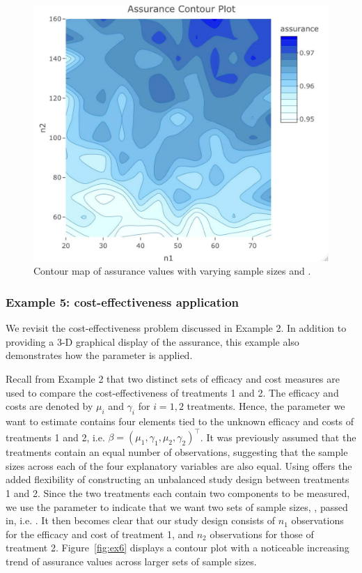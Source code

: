 \begin{figure}[t!]
\centering
\includegraphics[width = 10 cm]{ex5_contourplot.pdf}
\caption{\label{fig:ex5} Contour map of assurance values with
varying sample sizes  and .}
\end{figure}


\subsubsection{Example 5: cost-effectiveness application}
We revisit the cost-effectiveness problem discussed in Example 2. 
In addition to providing
a 3-D graphical display of the assurance, 
this example also demonstrates how the   
 parameter is applied. 

Recall from Example 2 that two distinct sets of efficacy and
cost measures are used to compare the cost-effectiveness 
of treatments 1 and 2. The efficacy and costs
are denoted by $\mu_i$ and $\gamma_i$ for 
$i = 1, 2$ treatments. Hence, the parameter we want to
estimate contains four elements tied to the unknown
efficacy and costs of treatments 1 and 2, i.e.
$\beta = (\mu_1, \gamma_1, \mu_2, \gamma_2)^{\top}$. 
It was previously assumed that the treatments contain an equal number of observations,
suggesting that the sample sizes across each of the four explanatory variables are also equal. Using  
offers the added flexibility of constructing an unbalanced 
study design between treatments 1
and 2.  Since the two treatments each contain two components
to be measured, we use the  parameter to indicate
that we want two sets of sample sizes, , passed in, 
i.e. . It then becomes clear that our
study design consists of $n_1$ observations for the efficacy
and cost of treatment 1, and $n_2$ observations for those
of treatment 2.  Figure~\ref{fig:ex6} displays a contour plot
with a noticeable increasing trend of assurance values across 
larger sets of sample sizes. 

